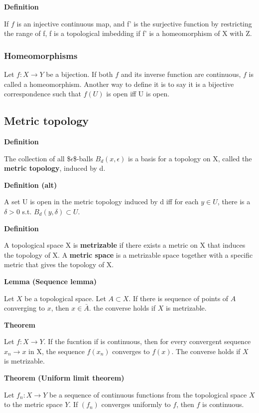 \documentclass[11pt]{article}
\begin{document}
\textbf{Definition}

If \(f\) is an injective continuous map, and f' is the surjective function by restricting the range of f, f is a topological imbedding if f' is a homeomorphism of X with Z.



\subsubsection{Homeomorphisms}
\label{sec:orgd80a8d2}

Let \(f : X \to Y\) be a bijection. If both \(f\) and its inverse function are continuous, \(f\) is called a homeomorphism.
Another way to define it is to say it is a bijective correspondence such that \(f(U)\) is open iff U is open.

\subsection{Metric topology}
\label{sec:org07aab22}

\textbf{Definition}

The collection of all \$\(\epsilon\)\$-balls \(B_d(x,\epsilon)\) is a basis for a topology on X, called the \textbf{metric topology}, induced by d.

\textbf{Definition (alt)}

A set U is open in the metric topology induced by d iff for each \(y \in U\), there is a \(\delta > 0\) s.t. \(B_d(y,\delta) \subset U\).

\textbf{Definition}

A topological space X is \textbf{metrizable} if there exists a metric on X that induces the topology of X. A \textbf{metric space} is a metrizable space together with a specific metric that gives the topology of X.

\textbf{Lemma (Sequence lemma)}

Let \(X\) be a topological space. Let \(A \subset X\). If there is sequence of points of \(A\) converging to \(x\), then \(x \in \bar{A}\). the converse holds if \(X\) is metrizable.


\textbf{Theorem}

Let \(f : X \to Y\). If the fucntion if is continuous, then for every convergent sequence \(x_n \to x\) in X, the sequence \(f(x_n)\) converges to \(f(x)\). The converse holds if \(X\) is metrizable.

\textbf{Theorem (Uniform limit theorem)}

Let \(f_n : X \to Y\) be a sequence of continuous functions from the topological space \(X\) to the metric space \(Y\). If \((f_n)\) converges uniformly to \(f\), then \(f\) is continuous.
\end{document}
